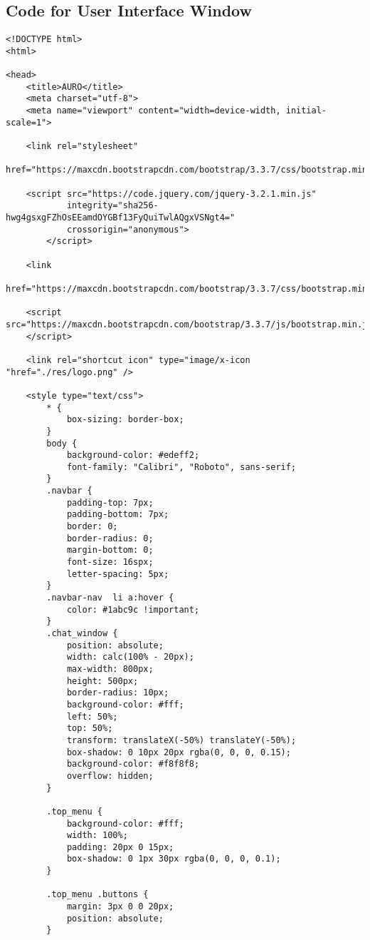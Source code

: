 \subsection*{Code for User Interface Window}
\begin{verbatim}
<!DOCTYPE html>
<html>

<head>
    <title>AURO</title>
    <meta charset="utf-8">
    <meta name="viewport" content="width=device-width, initial-scale=1">
    
    <link rel="stylesheet"
     href="https://maxcdn.bootstrapcdn.com/bootstrap/3.3.7/css/bootstrap.min.css">

    <script src="https://code.jquery.com/jquery-3.2.1.min.js" 
    		integrity="sha256-hwg4gsxgFZhOsEEamdOYGBf13FyQuiTwlAQgxVSNgt4=" 
    		crossorigin="anonymous">
    	</script>

    <link 
    href="https://maxcdn.bootstrapcdn.com/bootstrap/3.3.7/css/bootstrap.min.css">

    <script src="https://maxcdn.bootstrapcdn.com/bootstrap/3.3.7/js/bootstrap.min.js">
    </script>

    <link rel="shortcut icon" type="image/x-icon "href="./res/logo.png" />

    <style type="text/css">
        * {
            box-sizing: border-box;
        }
        body {
            background-color: #edeff2;
            font-family: "Calibri", "Roboto", sans-serif;
        }
        .navbar {
            padding-top: 7px;
            padding-bottom: 7px;
            border: 0;
            border-radius: 0;
            margin-bottom: 0;
            font-size: 16spx;
            letter-spacing: 5px;
        }
        .navbar-nav  li a:hover {
            color: #1abc9c !important;
        }
        .chat_window {
            position: absolute;
            width: calc(100% - 20px);
            max-width: 800px;
            height: 500px;
            border-radius: 10px;
            background-color: #fff;
            left: 50%;
            top: 50%;
            transform: translateX(-50%) translateY(-50%);
            box-shadow: 0 10px 20px rgba(0, 0, 0, 0.15);
            background-color: #f8f8f8;
            overflow: hidden;
        }
        
        .top_menu {
            background-color: #fff;
            width: 100%;
            padding: 20px 0 15px;
            box-shadow: 0 1px 30px rgba(0, 0, 0, 0.1);
        }
        
        .top_menu .buttons {
            margin: 3px 0 0 20px;
            position: absolute;
        }
        

\end{verbatim}

